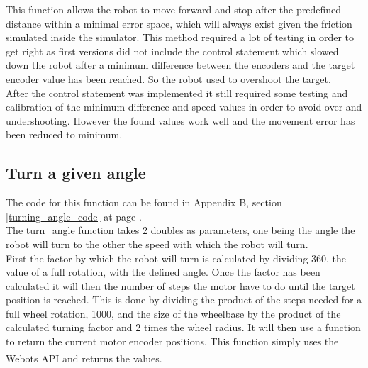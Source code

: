 \begin{flushleft}
This function allows the robot to move forward and stop after the predefined distance within a minimal error space, which will always exist given the friction simulated inside the simulator. This method required a lot of testing in order to get right as first versions did not include the control statement which slowed down the robot after a minimum difference between the encoders and the target encoder value has been reached. So the robot used to overshoot the target. \\
After the control statement was implemented it still required some testing and calibration of the minimum difference and speed values in order to avoid over and undershooting. However the found values work well and the movement error has been reduced to minimum.\\

\subsection{Turn a given angle}
\label{turn_angle_description}
The code for this function can be found in Appendix B, section \ref{turning_angle_code} at page \pageref{turning_angle_code}.\\
The turn\_angle function takes 2 doubles as parameters, one being the angle the robot will turn to the other the speed with which the robot will turn.\\
First the factor by which the robot will turn is calculated by dividing 360, the value of a full rotation, with the defined angle.
Once the factor has been calculated it will then the number of steps the motor have to do until the target position is reached. This is done by dividing the product of the steps needed for a full wheel rotation, 1000, and the size of the wheelbase by the product of the calculated turning factor and 2 times the wheel radius. It will then use a function to return the current motor encoder positions. This function simply uses the Webots\textsuperscript{\texttrademark}  API and returns the values. \\[3ex]


\end{flushleft}
